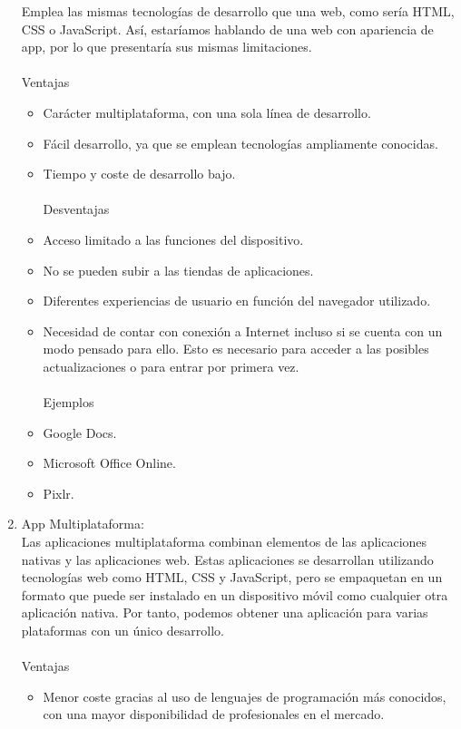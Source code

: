 \documentclass[12pt,twocolumn]{article}
\begin{document}
\begin{enumerate}
	Emplea las mismas tecnologías de desarrollo que una web, como sería HTML, CSS o JavaScript. Así, estaríamos hablando de una web con apariencia de app, por lo que presentaría sus mismas limitaciones.
	\\
	\\
	Ventajas
	
	\begin{itemize}
		\item Carácter multiplataforma, con una sola línea de desarrollo.
		\item Fácil desarrollo, ya que se emplean tecnologías ampliamente conocidas.
		\item Tiempo y coste de desarrollo bajo.
		\\
		\\
		Desventajas
		\\
		\item     Acceso limitado a las funciones del dispositivo.
		\item No se pueden subir a las tiendas de aplicaciones. 
		\item Diferentes experiencias de usuario en función del navegador utilizado.
		\item Necesidad de contar con conexión a Internet incluso si se cuenta con un modo pensado para ello. Esto es necesario para acceder a las posibles actualizaciones o para entrar por primera vez.
		\\
		\\
		Ejemplos
		\\
		\item Google Docs.
		\item Microsoft Office Online.
		\item Pixlr.
	\end{itemize}
	\item App Multiplataforma:
	\\
	Las aplicaciones multiplataforma combinan elementos de las aplicaciones nativas y las aplicaciones web. Estas aplicaciones se desarrollan utilizando tecnologías web como HTML, CSS y JavaScript, pero se empaquetan en un formato que puede ser instalado en un dispositivo móvil como cualquier otra aplicación nativa. Por tanto, podemos obtener una aplicación para varias plataformas con un único desarrollo.
	\\
	\\
	Ventajas
	\begin{itemize}
		\item Menor coste gracias al uso de lenguajes de programación más conocidos, con una mayor disponibilidad de profesionales en el mercado.

\end{itemize}
\end{enumerate}
\end{document}
